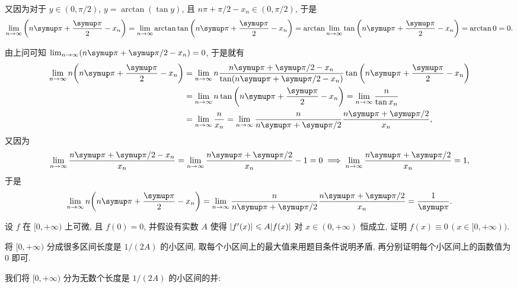 \begin{exercise}[series=exer]
\begin{answer}
\begin{answersheet}
          又因为对于 $ y \in (0, \pi/2) $, $ y = \arctan(\tan y) $, 且 $ n\pi + \pi/2 - x_{n} \in (0, \pi/2) $, 于是
          \begin{align*}
              \limit{n}{\infty}\qty(n \pi + \frac{\pi}{2} - x_{n}) = \limit{n}{\infty} \arctan\tan\qty(n \pi + \frac{\pi}{2} - x_{n}) = \arctan \limit{n}{\infty} \tan\qty(n \pi + \frac{\pi}{2} - x_{n}) = \arctan 0 = 0.
          \end{align*}
          \item 由上问可知 $ \limit{n}{\infty}(n\pi + \pi/2 - x_{n}) = 0 $, 于是就有
          \begin{align*}
              \limit{n}{\infty} n\qty(n\pi + \frac{\pi}{2} - x_{n}) & = \limit{n}{\infty} n \frac{n\pi + \pi/2 - x_{n}}{\tan(n\pi + \pi/2 - x_{n})}\tan\qty(n\pi + \frac{\pi}{2} - x_{n})\\
              & = \limit{n}{\infty} n \tan\qty(n\pi + \frac{\pi}{2} - x_{n}) = \limit{n}{\infty} \frac{n}{\tan x_{n}} \\
              & = \limit{n}{\infty} \frac{n}{x_{n}} = \limit{n}{\infty} \frac{n}{n \pi + \pi/2} \frac{n \pi + \pi/2}{x_{n}},
          \end{align*}
          又因为
          \begin{align*}
              \limit{n}{\infty} \frac{n\pi + \pi/2 - x_{n}}{x_{n}} = \limit{n}{\infty} \frac{n \pi + \pi/2}{x_{n}} - 1 = 0 \implies \limit{n}{\infty} \frac{n\pi + \pi/2}{x_{n}} = 1,
          \end{align*}
          于是
          \begin{align*}
              \limit{n}{\infty} n\qty(n\pi + \frac{\pi}{2} - x_{n}) = \limit{n}{\infty} \frac{n}{n \pi + \pi/2} \frac{n \pi + \pi/2}{x_{n}} = \frac{1}{\pi}.
          \end{align*}
      \end{answersheet}
  \end{answer}
  \item 设 $ f $ 在 $ [0, +\infty) $ 上可微, 且 $ f(0) = 0 $, 并假设有实数 $ A $ 使得 $ \abs{f'(x)} \leqslant A\abs{f(x)} $ 对 $ x \in (0, +\infty) $ 恒成立, 证明 $ f(x) \equiv 0\,(x \in [0, +\infty)) $.
  \begin{hint}
      将 $ [0, +\infty) $ 分成很多区间长度是 $ 1/(2A) $ 的小区间, 取每个小区间上的最大值来用题目条件说明矛盾, 再分别证明每个小区间上的函数值为 $ 0 $ 即可.
  \end{hint}
  \begin{answer}
      我们将 $ [0, +\infty) $ 分为无数个长度是 $ 1/(2A) $ 的小区间的并:

\end{answer}
\end{exercise}
